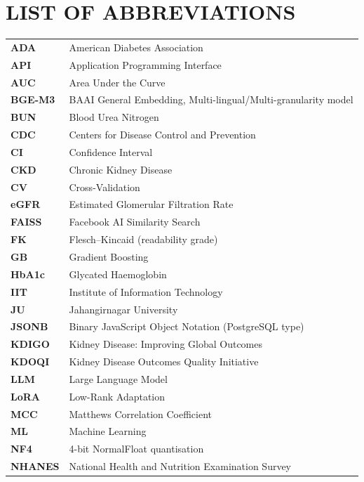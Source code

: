 \documentclass[12pt,a4paper,oneside]{report}
\begin{document}
\chapter*{LIST OF ABBREVIATIONS}
\thispagestyle{fancy}

\begin{longtable}{@{}p{1.3in}L{4.0in}@{}}
\textbf{ADA} & American Diabetes Association \\
\textbf{API} & Application Programming Interface \\
\textbf{AUC} & Area Under the Curve \\
\textbf{BGE-M3} & BAAI General Embedding, Multi-lingual/Multi-granularity model \\
\textbf{BUN} & Blood Urea Nitrogen \\
\textbf{CDC} & Centers for Disease Control and Prevention \\
\textbf{CI} & Confidence Interval \\
\textbf{CKD} & Chronic Kidney Disease \\
\textbf{CV} & Cross-Validation \\
\textbf{eGFR} & Estimated Glomerular Filtration Rate \\
\textbf{FAISS} & Facebook AI Similarity Search \\
\textbf{FK} & Flesch--Kincaid (readability grade) \\
\textbf{GB} & Gradient Boosting \\
\textbf{HbA1c} & Glycated Haemoglobin \\
\textbf{IIT} & Institute of Information Technology \\
\textbf{JU} & Jahangirnagar University \\
\textbf{JSONB} & Binary JavaScript Object Notation (PostgreSQL type) \\
\textbf{KDIGO} & Kidney Disease: Improving Global Outcomes \\
\textbf{KDOQI} & Kidney Disease Outcomes Quality Initiative \\
\textbf{LLM} & Large Language Model \\
\textbf{LoRA} & Low-Rank Adaptation \\
\textbf{MCC} & Matthews Correlation Coefficient \\
\textbf{ML} & Machine Learning \\
\textbf{NF4} & 4-bit NormalFloat quantisation \\
\textbf{NHANES} & National Health and Nutrition Examination Survey \\

\end{longtable}
\end{document}
